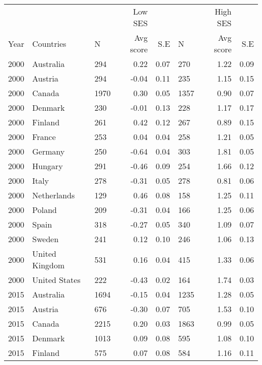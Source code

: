\documentclass[11pt, a4paper]{article}\usepackage[]{graphicx}\usepackage[]{color}
\begin{document}
\begin{table}[ht]
\centering
\begin{tabular}{lllrrlrr}
   \hline \
                          & & & Low SES & & & High SES \\
                          \cmidrule(l){3-5}
                          \cmidrule(l){6-8} Year & Countries & N & Avg score & S.E & N & Avg score & S.E \\ \hline2000 & Australia & 294 & 0.22 & 0.07 & 270 & 1.22 & 0.09 \\ 
  2000 & Austria & 294 & -0.04 & 0.11 & 235 & 1.15 & 0.15 \\ 
  2000 & Canada & 1970 & 0.30 & 0.05 & 1357 & 0.90 & 0.07 \\ 
  2000 & Denmark & 230 & -0.01 & 0.13 & 228 & 1.17 & 0.17 \\ 
  2000 & Finland & 261 & 0.42 & 0.12 & 267 & 0.89 & 0.15 \\ 
  2000 & France & 253 & 0.04 & 0.04 & 258 & 1.21 & 0.05 \\ 
  2000 & Germany & 250 & -0.64 & 0.04 & 303 & 1.81 & 0.05 \\ 
  2000 & Hungary & 291 & -0.46 & 0.09 & 254 & 1.66 & 0.12 \\ 
  2000 & Italy & 278 & -0.31 & 0.05 & 278 & 0.81 & 0.06 \\ 
  2000 & Netherlands & 129 & 0.46 & 0.08 & 158 & 1.25 & 0.11 \\ 
  2000 & Poland & 209 & -0.31 & 0.04 & 166 & 1.25 & 0.06 \\ 
  2000 & Spain & 318 & -0.27 & 0.05 & 340 & 1.09 & 0.07 \\ 
  2000 & Sweden & 241 & 0.12 & 0.10 & 246 & 1.06 & 0.13 \\ 
  2000 & United Kingdom & 531 & 0.16 & 0.04 & 415 & 1.33 & 0.06 \\ 
  2000 & United States & 222 & -0.43 & 0.02 & 164 & 1.74 & 0.03 \\ 
  2015 & Australia & 1694 & -0.15 & 0.04 & 1235 & 1.28 & 0.05 \\ 
  2015 & Austria & 676 & -0.30 & 0.07 & 705 & 1.53 & 0.10 \\ 
  2015 & Canada & 2215 & 0.20 & 0.03 & 1863 & 0.99 & 0.05 \\ 
  2015 & Denmark & 1013 & 0.09 & 0.08 & 595 & 1.08 & 0.10 \\ 
  2015 & Finland & 575 & 0.07 & 0.08 & 584 & 1.16 & 0.11 \\ 

\end{tabular}
\end{table}
\end{document}
